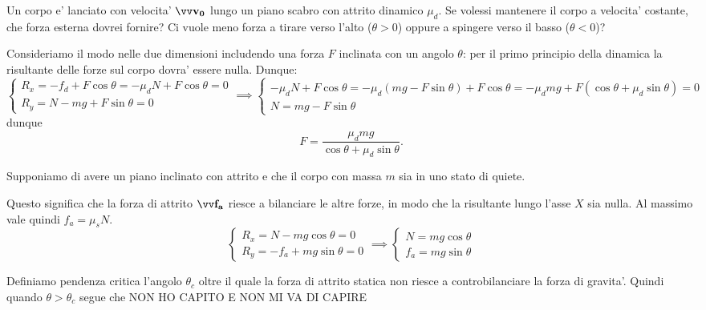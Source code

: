 \begin{example}
    Un corpo e' lanciato con velocita' $\bvv{v_0}$ lungo un piano scabro con attrito dinamico $\mu_d$. Se volessi mantenere il corpo a velocita' costante, che forza esterna dovrei fornire? Ci vuole meno forza a tirare verso l'alto ($\theta > 0$) oppure a spingere verso il basso ($\theta < 0$)?

    Consideriamo il modo nelle due dimensioni includendo una forza $F$ inclinata con un angolo $\theta$: per il primo principio della dinamica la risultante delle forze sul corpo dovra' essere nulla. Dunque:
    \begin{equation*}
        \begin{cases}
            R_x = -f_d + F\cos\theta = -\mu_d N + F\cos\theta = 0\\
            R_y = N - mg + F\sin\theta = 0       
        \end{cases}
        \implies \begin{cases}
            -\mu_d N + F\cos\theta = -\mu_d (mg - F\sin\theta) + F\cos\theta = -\mu_d mg + F(\cos\theta + \mu_d\sin\theta) = 0\\
            N = mg - F\sin\theta
        \end{cases} 
    \end{equation*}
    dunque \[
        F = \frac{\mu_d mg}{\cos\theta + \mu_d \sin\theta}.    
    \]    
\end{example}

\begin{example}
    Supponiamo di avere un piano inclinato con attrito e che il corpo con massa $m$ sia in uno stato di quiete.

    Questo significa che la forza di attrito $\bvv{f_a}$ riesce a bilanciare le altre forze, in modo che la risultante lungo l'asse $X$ sia nulla. Al massimo vale quindi $f_a = \mu_s N$.
    \begin{equation*}
        \begin{cases}
            R_x = N - mg\cos\theta = 0\\
            R_y = -f_a + mg\sin\theta = 0
        \end{cases} \implies
        \begin{cases}
            N = mg\cos\theta\\
            f_a = mg\sin\theta
        \end{cases} 
    \end{equation*}
    
    Definiamo pendenza critica l'angolo $\theta_c$ oltre il quale la forza di attrito statica non riesce a controbilanciare la forza di gravita'. Quindi quando $\theta > \theta_c$ segue che NON HO CAPITO E NON MI VA DI CAPIRE
\end{example}

